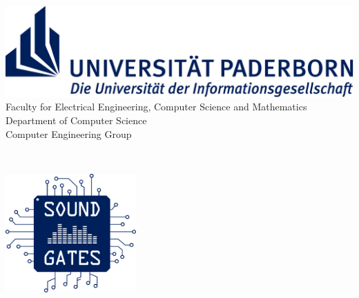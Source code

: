 \newcommand{\HRule}{\rule{\linewidth}{0.5mm}}

\begin{titlepage}

\begin{center}


\begin{minipage}{\linewidth}
	\includegraphics[width=\textwidth]{./images/UPB_Logo_RGB_12}
    \textsf
    {
    	\hspace*{2.6cm} Faculty for Electrical Engineering, Computer Science and Mathematics\\
        \hspace*{2.6cm} Department of Computer Science\\
        \hspace*{2.6cm} Computer Engineering Group \\
    }
\end{minipage}\\[1.2cm]

\begin{minipage}{\linewidth}
	\centering
	\includegraphics[width=5.0cm]{./images/soundgates_logo.pdf}	
\end{minipage} \\[1.2cm]


\end{center}
\end{titlepage}
